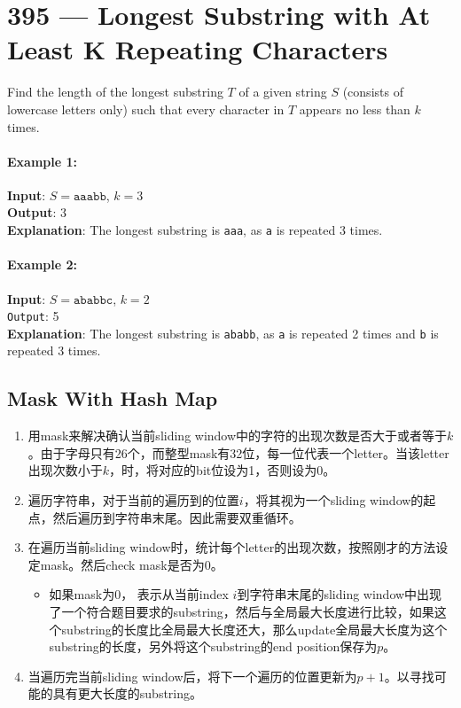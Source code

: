 \section{395 --- Longest Substring with At Least K Repeating Characters}
Find the length of the longest substring $T$ of a given string $S$ (consists of lowercase letters only) such that every character in $T$ appears no less than $k$ times.

\paragraph{Example 1:}

\begin{flushleft}
\textbf{Input}: $S = \texttt{aaabb}$, $k = 3$
\\
\textbf{Output}: 3
\\
\textbf{Explanation}: The longest substring is \texttt{aaa}, as \texttt{a} is repeated 3 times.
\end{flushleft}

\paragraph{Example 2:}

\begin{flushleft}
\textbf{Input}: $S = \texttt{ababbc}$, $k = 2$
\\
\texttt{Output}: 5
\\
\textbf{Explanation}: The longest substring is \texttt{ababb}, as \texttt{a} is repeated 2 times and \texttt{b} is repeated 3 times.
\end{flushleft}

\subsection{Mask With Hash Map}
\begin{enumerate}
\item 用mask来解决确认当前sliding window中的字符的出现次数是否大于或者等于$k$。由于字母只有26个，而整型mask有32位，每一位代表一个letter。当该letter出现次数小于$k$，时，将对应的bit位设为1，否则设为0。
\item 遍历字符串，对于当前的遍历到的位置$i$，将其视为一个sliding window的起点，然后遍历到字符串末尾。因此需要双重循环。
\item 在遍历当前sliding window时，统计每个letter的出现次数，按照刚才的方法设定mask。然后check mask是否为0。
\begin{itemize}
\item 如果mask为0， 表示从当前index $i$到字符串末尾的sliding window中出现了一个符合题目要求的substring，然后与全局最大长度进行比较，如果这个substring的长度比全局最大长度还大，那么update全局最大长度为这个substring的长度，另外将这个substring的end position保存为$p$。
\end{itemize}
\item 当遍历完当前sliding window后，将下一个遍历的位置更新为$p+1$。以寻找可能的具有更大长度的substring。
\end{enumerate}

